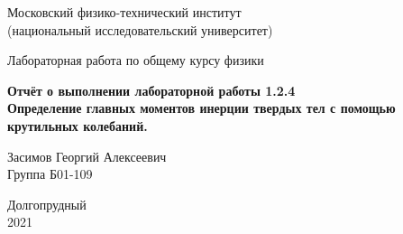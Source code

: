 

\usepackage[T2A]{fontenc}			%
\usepackage[utf8]{inputenc}			%
\usepackage[english,russian]{babel}	%
\usepackage{tikz}
\usepackage{pgfplots}


\usepackage{amsmath,amsfonts,amssymb,amsthm,mathtools} 


\usepackage{wasysym}

    
\begin{titlepage}

    \newpage
    \begin{center}
        \normalsize Московский физико-технический институт \\(национальный исследовательский университет)
    \end{center}

    \vspace{6em}

    \begin{center}
        \Large Лабораторная работа по общему курсу физики\\
    \end{center}

    \vspace{1em}

    \begin{center}
        \Large \textbf{Отчёт о выполнении лабораторной работы 1.2.4\\ {Определение главных моментов инерции твердых тел с помощью крутильных колебаний.}}
    \end{center}

    \vspace{2em}

    \begin{center}
        \large Засимов Георгий Алексеевич \\
        Группа Б01-109
    \end{center}

    \vspace{\fill}

    \begin{center}
    Долгопрудный \\2021
    \end{center}
    
\end{titlepage}

\newpage

